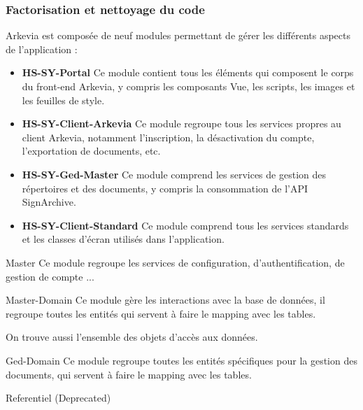 \subsubsection{Factorisation et nettoyage du code}
Arkevia est composée de neuf modules permettant de gérer les différents aspects de l'application :

\begin{itemize}
    \item \textbf{HS-SY-Portal}
    Ce module contient tous les éléments qui composent le corps du front-end Arkevia, y compris les composants Vue, les scripts, les images et les feuilles de style.
    \item \textbf{HS-SY-Client-Arkevia}
    Ce module regroupe tous les services propres au client Arkevia, notamment l'inscription, la désactivation du compte, l'exportation de documents, etc.
    \item \textbf{HS-SY-Ged-Master}
    Ce module comprend les services de gestion des répertoires et des documents, y compris la consommation de l'API SignArchive.
    \item \textbf{HS-SY-Client-Standard}
    Ce module comprend tous les services standards et les classes d'écran utilisés dans l'application.
\end{itemize}
Master
Ce module regroupe les services de configuration, d'authentification, de gestion de compte ...

Master-Domain
Ce module gère les interactions avec la base de données, il regroupe toutes les entités qui servent à faire le mapping avec les tables.

On trouve aussi l'ensemble des objets d'accès aux données.

Ged-Domain
Ce module regroupe toutes les entités spécifiques pour la gestion des documents, qui servent à faire le mapping avec les tables.


Referentiel
(Deprecated)


